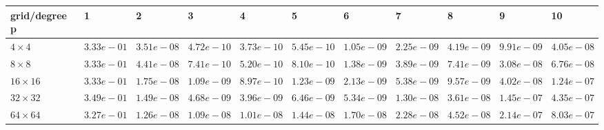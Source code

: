 \begin{tabular}{lllllllllll}
\hline
 grid/degree p   & 1          & 2          & 3          & 4          & 5          & 6          & 7          & 8          & 9          & 10         \\
\hline
 $4 \times 4$    & $3.33e-01$ & $3.51e-08$ & $4.72e-10$ & $3.73e-10$ & $5.45e-10$ & $1.05e-09$ & $2.25e-09$ & $4.19e-09$ & $9.91e-09$ & $4.05e-08$ \\
 $8 \times 8$    & $3.33e-01$ & $4.41e-08$ & $7.41e-10$ & $5.20e-10$ & $8.10e-10$ & $1.38e-09$ & $3.89e-09$ & $7.41e-09$ & $3.08e-08$ & $6.76e-08$ \\
 $16 \times 16$  & $3.33e-01$ & $1.75e-08$ & $1.09e-09$ & $8.97e-10$ & $1.23e-09$ & $2.13e-09$ & $5.38e-09$ & $9.57e-09$ & $4.02e-08$ & $1.24e-07$ \\
 $32 \times 32$  & $3.49e-01$ & $1.49e-08$ & $4.68e-09$ & $3.96e-09$ & $6.46e-09$ & $5.34e-09$ & $1.30e-08$ & $3.61e-08$ & $1.45e-07$ & $4.35e-07$ \\
 $64 \times 64$  & $3.27e-01$ & $1.26e-08$ & $1.09e-08$ & $1.01e-08$ & $1.44e-08$ & $1.70e-08$ & $2.28e-08$ & $4.52e-08$ & $2.14e-07$ & $8.03e-07$ \\
\hline
\end{tabular}